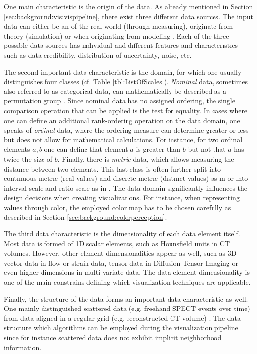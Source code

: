 \begin{my_list_desc}
	\item[Source]
		One main characteristic is the origin of the data.
		As already mentioned in Section \ref{sec:background:vis:vispipeline}, there exist three different data sources. 
		The input data can either be an  of the real world (through measuring), originate from theory (simulation) or  when originating from modeling \CN.
		Each of the three possible data sources has individual and different features and characteristics such as data credibility, distribution of uncertainty, noise, etc.
	
	\item[Domain]
		The second important data characteristic is the domain, for which one usually distinguishes four classes (cf. Table \ref{tbl:ListOfScales}).
		\emph{Nominal} data, sometimes also referred to as categorical data, can mathematically be described as a permutation group \cite{Stevens:1946:TheoryOfScales}.
		Since nominal data has no assigned ordering, the single comparison operation that can be applied is the test for equality.
		In cases where one can define an additional rank-ordering operation on the data domain, one speaks of \emph{ordinal} data, where the ordering measure can determine greater or less but does not allow for mathematical calculations.
		For instance, for two ordinal elements $a, b$ one can define that element $a$ is greater than $b$ but not that $a$ has twice the size of $b$.
		Finally, there is \emph{metric} data, which allows measuring the distance between two elements.
		This last class is often further split into continuous metric (real values) and discrete metric (distinct values) as in \CN or into interval scale and ratio scale as in \cite{Stevens:1946:TheoryOfScales}.
		The data domain significantly influences the design decisions when creating visualizations.
		For instance, when representing values through color, the employed color map has to be chosen carefully as described in Section \ref{sec:background:colorperception}.

	\item[Dimensionality]
		The third data characteristic is the dimensionality of each data element itself.
		Most data is formed of 1D scalar elements, such as Hounsfield units in CT volumes.
		However, other element dimensionalities appear as well, such as 3D vector data in flow or strain data, tensor data in Diffusion Tensor Imaging or even higher dimensions in multi-variate data.
		The data element dimensionality is one of the main constrains defining which visualization techniques are applicable.

	\item[Structure]
		Finally, the structure of the data forms an important data characteristic as well.
		One mainly distinguished scattered data (e.g. freehand SPECT events over time) from data aligned in a regular grid (e.g. reconstructed CT volume) \CN.
		The data structure  which algorithms can be employed during the visualization pipeline since for instance scattered data does not exhibit implicit neighborhood information.
\end{my_list_desc}
